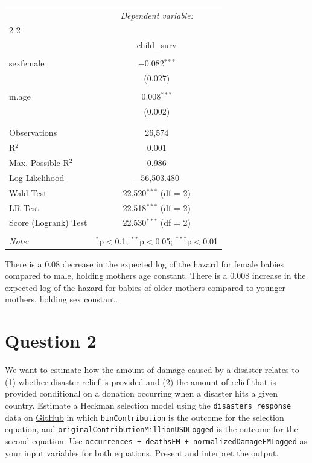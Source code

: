 \documentclass[12pt,letterpaper]{article}
\begin{document}
\begin{table}[H] \centering 
	\caption{} 
	\label{} 
	\begin{tabular}{@{\extracolsep{5pt}}lc} 
		\\[-1.8ex]\hline 
		\hline \\[-1.8ex] 
		& \multicolumn{1}{c}{\textit{Dependent variable:}} \\ 
		\cline{2-2} 
		\\[-1.8ex] & child\_surv \\ 
		\hline \\[-1.8ex] 
		sexfemale & $-$0.082$^{***}$ \\ 
		& (0.027) \\ 
		& \\ 
		m.age & 0.008$^{***}$ \\ 
		& (0.002) \\ 
		& \\ 
		\hline \\[-1.8ex] 
		Observations & 26,574 \\ 
		R$^{2}$ & 0.001 \\ 
		Max. Possible R$^{2}$ & 0.986 \\ 
		Log Likelihood & $-$56,503.480 \\ 
		Wald Test & 22.520$^{***}$ (df = 2) \\ 
		LR Test & 22.518$^{***}$ (df = 2) \\ 
		Score (Logrank) Test & 22.530$^{***}$ (df = 2) \\ 
		\hline 
		\hline \\[-1.8ex] 
		\textit{Note:}  & \multicolumn{1}{r}{$^{*}$p$<$0.1; $^{**}$p$<$0.05; $^{***}$p$<$0.01} \\ 
	\end{tabular} 
\end{table} 

There is a 0.08 decrease in the expected log of the hazard for female babies compared to male, holding mothers age constant. There is a 0.008 increase in the expected log of the hazard for babies of older mothers compared to younger mothers, holding sex constant.


\section*{Question 2}
\vspace{.25cm}
\noindent We want to estimate how the amount of damage caused by a disaster relates to (1) whether disaster relief is provided and (2) the amount of relief that is provided  conditional on a donation occurring when a disaster hits a given country. Estimate a Heckman selection model using the \texttt{disasters\_response} data on \href{https://raw.githubusercontent.com/ASDS-TCD/StatsII_2026/refs/heads/main/datasets/disaster_response.csv}{GitHub} in which \texttt{binContribution} is the outcome for the selection equation, and \texttt{originalContributionMillionUSDLogged} is the outcome for the second equation. Use \texttt{occurrences  + deathsEM + normalizedDamageEMLogged} as your input variables for both equations. Present and interpret the output.
\end{document}
